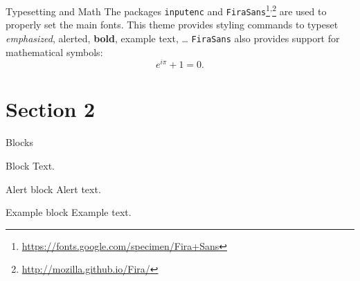 \documentclass{beamer}
\begin{document}
    
    
    
    \begin{frame}{Typesetting and Math}
        The packages \texttt{inputenc} and \texttt{FiraSans}\footnote{\url{https://fonts.google.com/specimen/Fira+Sans}}\textsuperscript{,}\footnote{\url{http://mozilla.github.io/Fira/}} are used to properly set the main fonts.
        \vfill
        This theme provides styling commands to typeset \emph{emphasized}, \alert{alerted}, \textbf{bold}, \textcolor{example}{example text}, \dots
        \vfill
        \texttt{FiraSans} also provides support for mathematical symbols:
        \begin{equation*}
            e^{i\pi} + 1 = 0.
        \end{equation*}
    \end{frame}

    \section{Section 2}
    \begin{frame}{Blocks}
        \begin{block}{Block}
            Text.
        \end{block}
        \pause
        \begin{alertblock}{Alert block}
            Alert \alert{text}.
        \end{alertblock}
        \pause
        \begin{exampleblock}{Example block}
            Example \textcolor{example}{text}.
        \end{exampleblock}
    \end{frame}
    
\end{document}
